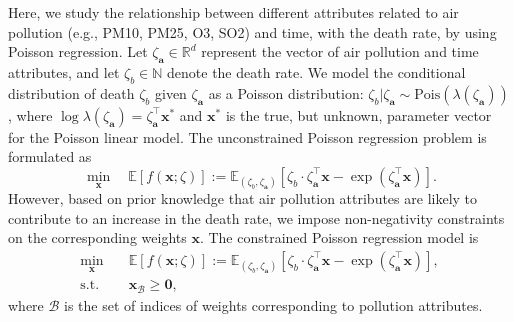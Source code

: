 \documentclass[aos]{imsart}
\numberwithin{equation}{section}
\theoremstyle{plain}
\begin{document}
Here, we study the relationship between different attributes related to air pollution (e.g., PM10, PM25, O3, SO2) and time, with the death rate, by using Poisson regression. 
Let $\zeta_{\bm{a}} \in \mathbb{R}^{d}$ represent the vector of air pollution and time attributes, and let $\zeta_{b} \in \mathbb{N}$ denote the death rate.
We model the conditional distribution of death $\zeta_{b}$ given $\zeta_{\bm{a}}$ as a Poisson distribution: $\zeta_{b}|\zeta_{\bm{a}}  \sim \text{Pois}(\lambda(\zeta_{\bm{a}}))$, where $\log \lambda(\zeta_{\bm{a}}) = \zeta_{\bm{a}}^{\top} \bm{x}^{*}$ and $\bm{x}^{*}$ is the true, but unknown, parameter vector for the Poisson linear model.
The unconstrained Poisson regression problem is formulated as 
    \begin{equation}
    \label{poisson_unconstrained}
            \min_{\bm{x}} \hspace{1em} \mathbb{E} \left[f(\bm{x};\zeta) \right] := \mathbb{E}_{(\zeta_{b},\zeta_{\bm{a}})} \left[ \zeta_{b} \cdot \zeta_{\bm{a}}^{\top} \bm{x} - \exp \left(\zeta_{\bm{a}}^{\top} \bm{x} \right) \right].
    \end{equation}
However, based on prior knowledge that air pollution attributes are likely to contribute to an increase in the death rate, we impose non-negativity constraints on the corresponding weights $\bm{x}$.
The constrained Poisson regression model is
\begin{equation}
 \label{poisson_constrained}
        \begin{split}
            \min_{\bm{x}} &  \hspace{1em} \mathbb{E} \left[f(\bm{x};\zeta) \right] := \mathbb{E}_{(\zeta_{b},\zeta_{\bm{a}})} \left[ \zeta_{b} \cdot \zeta_{\bm{a}}^{\top} \bm{x} - \exp \left(\zeta_{\bm{a}}^{\top} \bm{x} \right) \right], \\
            \text{s.t.} & \hspace{1em} \bm{x}_{\mathcal{B}} \geq \bm{0},
        \end{split}
    \end{equation}
    where $\mathcal{B}$ is the set of indices of weights corresponding to pollution attributes. 
\end{document}
